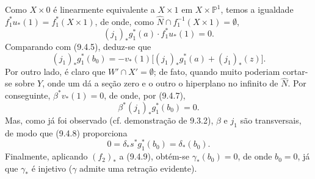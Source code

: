 Como $X\times0$ é linearmente equivalente a $X\times1$ em $X\times\mathbb P^1$, temos a igualdade $f_1^*u_*(1)=f_1^*(X\times1)$, de onde, como $\widehat N\cap f_1^{-1}(X\times1)=\emptyset$,
\[
(j_1)_*g_1^*(a)\cdot f_1^*u_*(1)=0.
\tag{9.4.6}
\]
Comparando com (9.4.5), deduz-se que
\[
(j_1)_*g_1^*(b_0)=-v_*(1)\bigl[(j_1)_*g_1^*(a)+(j_1)_*(z)\bigr].
\tag{9.4.7}
\]
Por outro lado, é claro que $W'\cap X'=\emptyset$; de fato, quando muito poderiam cortar-se sobre $Y$, onde um dá a seção zero e o outro o hiperplano no infinito de $\widehat N$. Por conseguinte, $\beta^*v_*(1)=0$, de onde, por (9.4.7),
\[
\beta^*(j_1)_*g_1^*(b_0)=0.
\tag{9.4.8}
\]
Mas, como já foi observado (cf. demonstração de 9.3.2), $\beta$ e $j_1$ são transversais, de modo que (9.4.8) proporciona
\[
0=\delta_*s^*g_1^*(b_0)=\delta_*(b_0).
\tag{9.4.9}
\]
Finalmente, aplicando $(f_2)_*$ a (9.4.9), obtém-se $\gamma_*(b_0)=0$, de onde $b_0=0$, já que $\gamma_*$ é injetivo ($\gamma$ admite uma retração evidente).
